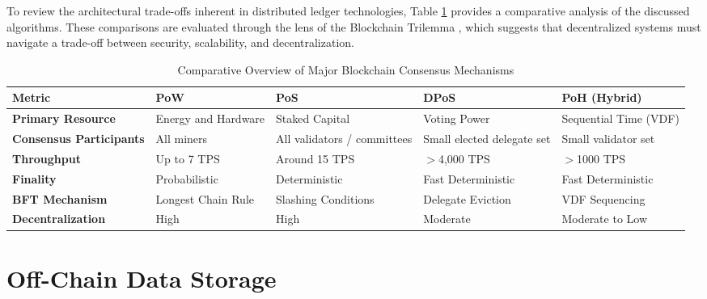 To review the architectural trade-offs inherent in distributed ledger technologies, Table \ref{table:consensus_comparison} provides a comparative analysis of the discussed algorithms. These comparisons are evaluated through the lens of the Blockchain Trilemma \cite{blockchainTrilemma}, which suggests that decentralized systems must navigate a trade-off between security, scalability, and decentralization.
\begin{table}[H]
    \centering
    \small
    \renewcommand{\arraystretch}{1.8}
    \begin{tabularx}{\textwidth}{|l|X|X|X|X|}
        \hline
        \textbf{Metric} 
        & \textbf{PoW} 
        & \textbf{PoS} 
        & \textbf{DPoS} 
        & \textbf{PoH (Hybrid)} \\ \hline
        
        \textbf{Primary Resource} 
        & Energy and Hardware 
        & Staked Capital 
        & Voting Power 
        & Sequential Time (VDF) \\ \hline
        
        \textbf{Consensus Participants} 
        & All miners 
        & All validators / committees 
        & Small elected delegate set 
        & Small validator set \\ \hline
        
        \textbf{Throughput} 
        & Up to 7 TPS~\cite{onScalingDecentralized}
        & Around 15 TPS~\cite{scallingWithRollups}
        & $>$4,000 TPS~\cite{PDPoS}
        & $>$1000 TPS~\cite{mishra2024solana} \\ \hline
        
        \textbf{Finality} 
        & Probabilistic 
        & Deterministic 
        & Fast Deterministic 
        & Fast Deterministic \\ \hline
        
        \textbf{BFT Mechanism} 
        & Longest Chain Rule 
        & Slashing Conditions 
        & Delegate Eviction 
        & VDF Sequencing \\ \hline
        
        \textbf{Decentralization} 
        & High 
        & High 
        & Moderate 
        & Moderate to Low \\ \hline
    \end{tabularx}
    \caption{Comparative Overview of Major Blockchain Consensus Mechanisms}
    \label{table:consensus_comparison}
\end{table}

\section{Off-Chain Data Storage} \label{ch2_storage}

